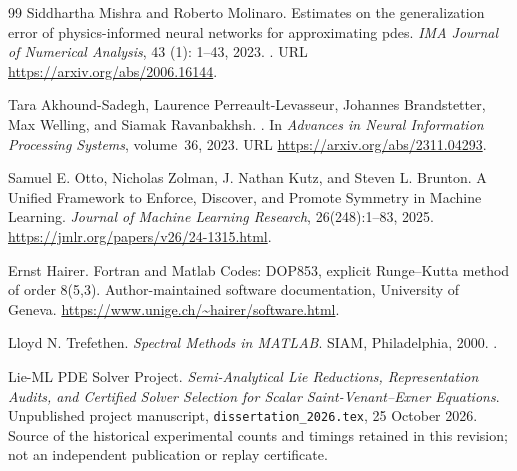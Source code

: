 \documentclass[11pt,a4paper,oneside]{report}
\numberwithin{equation}{chapter}
\DeclareRobustCommand{\code}[1]{\nolinkurl{#1}}
\begin{document}
\begin{thebibliography}{99}
Siddhartha Mishra and Roberto Molinaro.
\newblock Estimates on the generalization error of physics-informed neural
  networks for approximating pdes.
\newblock \emph{IMA Journal of Numerical Analysis}, 43 (1):
  1--43, 2023.
\newblock {}.
\newblock URL \url{https://arxiv.org/abs/2006.16144}.

Tara Akhound-Sadegh, Laurence Perreault-Levasseur, Johannes Brandstetter, Max
  Welling, and Siamak Ravanbakhsh.
.
\newblock In \emph{Advances in Neural Information Processing Systems},
  volume~36, 2023.
\newblock URL \url{https://arxiv.org/abs/2311.04293}.

Samuel E. Otto, Nicholas Zolman, J. Nathan Kutz, and Steven L. Brunton.
\newblock A Unified Framework to Enforce, Discover, and Promote Symmetry in Machine Learning.
\newblock \emph{Journal of Machine Learning Research}, 26(248):1--83, 2025.
\newblock \url{https://jmlr.org/papers/v26/24-1315.html}.

Ernst Hairer.
\newblock Fortran and Matlab Codes: DOP853, explicit Runge--Kutta method of order 8(5,3).
\newblock Author-maintained software documentation, University of Geneva.
\newblock \url{https://www.unige.ch/~hairer/software.html}.

Lloyd N. Trefethen.
\newblock \emph{Spectral Methods in MATLAB}.
\newblock SIAM, Philadelphia, 2000.
\newblock {}.

Lie-ML PDE Solver Project.
\newblock \emph{Semi-Analytical Lie Reductions, Representation Audits, and Certified Solver Selection for Scalar Saint-Venant--Exner Equations}.
\newblock Unpublished project manuscript, \code{dissertation_2026.tex}, 25 October 2026.
\newblock Source of the historical experimental counts and timings retained in this revision; not an independent publication or replay certificate.

\end{thebibliography}
\endgroup
\end{document}
